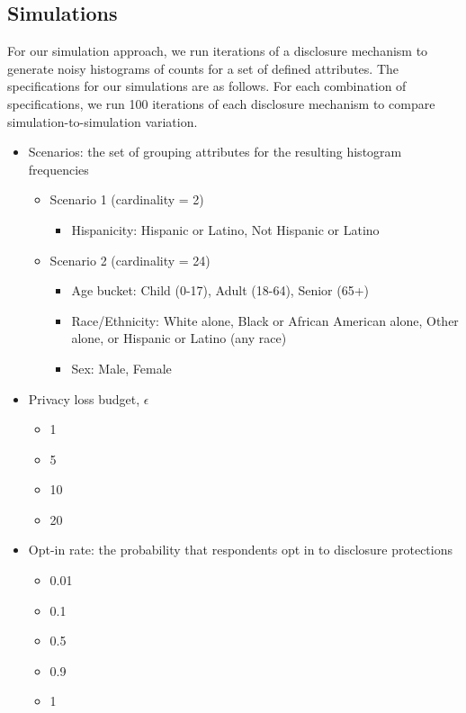 \documentclass[
]{urban-formatting}
\providecommand{\tightlist}{%
  \setlength{\itemsep}{0pt}\setlength{\parskip}{0pt}}\usepackage{longtable,booktabs,array}
\begin{document}
\subsection{Simulations}

For our simulation approach, we run iterations of a disclosure mechanism
to generate noisy histograms of counts for a set of defined attributes.
The specifications for our simulations are as follows. For each
combination of specifications, we run 100 iterations of each disclosure
mechanism to compare simulation-to-simulation variation.

\begin{itemize}
\tightlist
\item
  Scenarios: the set of grouping attributes for the resulting histogram
  frequencies

  \begin{itemize}
  \tightlist
  \item
    Scenario 1 (cardinality = 2)

    \begin{itemize}
    \tightlist
    \item
      Hispanicity: Hispanic or Latino, Not Hispanic or Latino
    \end{itemize}
  \item
    Scenario 2 (cardinality = 24)

    \begin{itemize}
    \item
      Age bucket: Child (0-17), Adult (18-64), Senior (65+)
    \item
      Race/Ethnicity: White alone, Black or African American alone,
      Other alone, or Hispanic or Latino (any race)
    \item
      Sex: Male, Female
    \end{itemize}
  \end{itemize}
\item
  Privacy loss budget, \(\epsilon\)

  \begin{itemize}
  \tightlist
  \item
    1
  \item
    5
  \item
    10
  \item
    20
  \end{itemize}
\item
  Opt-in rate: the probability that respondents opt in to disclosure
  protections

  \begin{itemize}
  \item
    0.01
  \item
    0.1
  \item
    0.5
  \item
    0.9
  \item
    1
  \end{itemize}
\end{itemize}
\end{document}
